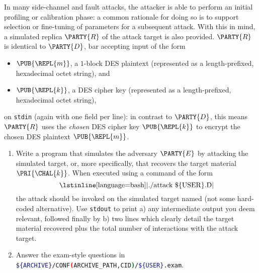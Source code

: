 \documentclass[crop={false},multi={true},tikz={true}]{standalone}
\begin{document}

In many side-channel and fault attacks, the attacker is able to perform an 
initial profiling or calibration phase: a common rationale for doing so is 
to support selection or fine-tuning of parameters for a subsequent attack.  
With this in mind, a simulated replica $\PARTY{R}$ of the attack target is 
also provided.
$\PARTY{R}$ is identical to $\PARTY{D}$, bar accepting input of the form

\begin{itemize}
\item $\PUB{\REPL{m}}$, 
      a  $1$-block DES plaintext
      (represented as a  length-prefixed, hexadecimal octet   string), 
      and
\item $\PUB{\REPL{k}}$, 
      a           DES cipher key
      (represented as a  length-prefixed, hexadecimal octet   string), 
\end{itemize}

\noindent
on \lstinline[language={bash}]{stdin} (again with one field per line):
in contrast to $\PARTY{D}$, this means $\PARTY{R}$ uses the
{\em chosen} DES cipher key $\PUB{\REPL{k}}$
to encrypt the
     chosen  DES  plaintext $\PUB{\REPL{m}}$.



\begin{enumerate}
\item Write a program that simulates the adversary $\PARTY{E}$ by attacking
      the simulated target, or, more specifically, that recovers the target 
      material $\PRI{\CHAL{k}}$.  
      When executed using a command of the form
      \[
      \mbox{\lstinline[language={bash}]|./attack \$\{USER\}.D|}
      \]
      the attack should be invoked on the simulated target named (not some
      hard-coded alternative).  Use \lstinline[language={bash}]{stdout} to 
      print 
      a) any intermediate output you deem relevant, followed finally by 
      b) two lines which clearly detail the target material recovered plus
         the total number of interactions with the attack target.
\item Answer the exam-style questions in 
      \lstinline[language={bash}]|${ARCHIVE}/CONF(ARCHIVE_PATH,CID)/${USER}.exam|.
\end{enumerate}

\end{document}
